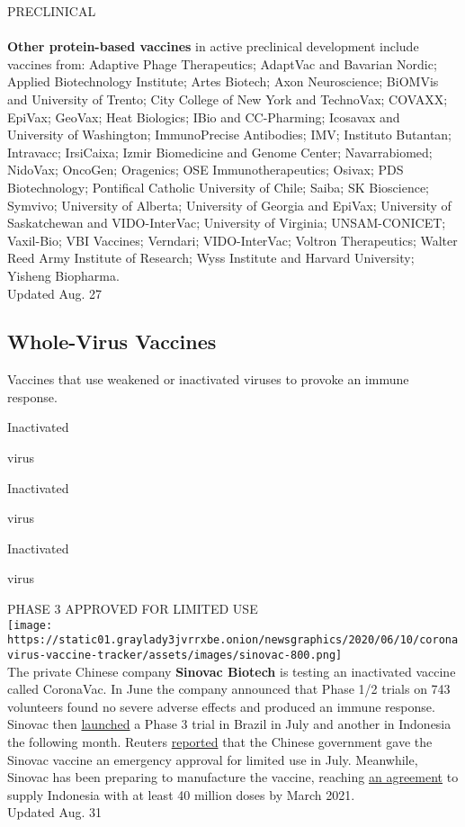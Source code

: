 PRECLINICAL\\
~\\
 \textbf{Other protein-based vaccines} in active preclinical development
include vaccines from: Adaptive Phage Therapeutics; AdaptVac and
Bavarian Nordic; Applied Biotechnology Institute; Artes Biotech; Axon
Neuroscience; BiOMVis and University of Trento; City College of New York
and TechnoVax; COVAXX; EpiVax; GeoVax; Heat Biologics; IBio and
CC-Pharming; Icosavax and University of Washington; ImmunoPrecise
Antibodies; IMV; Instituto Butantan; Intravacc; IrsiCaixa; Izmir
Biomedicine and Genome Center; Navarrabiomed; NidoVax; OncoGen;
Oragenics; OSE Immunotherapeutics; Osivax; PDS Biotechnology; Pontifical
Catholic University of Chile; Saiba; SK Bioscience; Symvivo; University
of Alberta; University of Georgia and EpiVax; University of Saskatchewan
and VIDO-InterVac; University of Virginia; UNSAM-CONICET; Vaxil-Bio; VBI
Vaccines; Verndari; VIDO-InterVac; Voltron Therapeutics; Walter Reed
Army Institute of Research; Wyss Institute and Harvard University;
Yisheng Biopharma.\\
Updated Aug. 27

\hypertarget{whole-virus-vaccines}{%
\subsection{Whole-Virus Vaccines}\label{whole-virus-vaccines}}

Vaccines that use weakened or inactivated viruses to provoke an immune
response.

Inactivated

virus

Inactivated

virus

Inactivated

virus

PHASE 3 APPROVED FOR LIMITED USE\\
\texttt{[image: https://static01.graylady3jvrrxbe.onion/newsgraphics/2020/06/10/coronavirus-vaccine-tracker/assets/images/sinovac-800.png]}\\
The private Chinese company \textbf{Sinovac Biotech} is testing an
inactivated vaccine called CoronaVac. In June the company announced that
Phase 1/2 trials on 743 volunteers found no severe adverse effects and
produced an immune response. Sinovac then
\href{http://www.sinovac.com/?optionid=754\&auto_id=907}{launched} a
Phase 3 trial in Brazil in July and another in Indonesia the following
month. Reuters
\href{https://www.nytimes3xbfgragh.onion/reuters/2020/08/28/world/asia/28reuters-health-coronavirus-china-vaccines.html}{reported}
that the Chinese government gave the Sinovac vaccine an emergency
approval for limited use in July. Meanwhile, Sinovac has been preparing
to manufacture the vaccine, reaching
\href{https://www.businesswire.com/news/home/20200825005451/en/Sinovac-Signs-Agreement-Bio-Farma-Indonesia-COVID-19}{an
agreement} to supply Indonesia with at least 40 million doses by March
2021.\\
Updated Aug. 31

